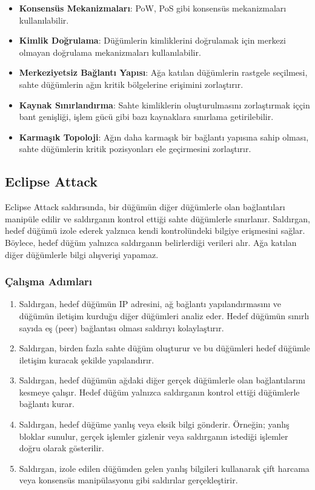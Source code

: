\begin{itemize}
    \item \textbf{Konsensüs Mekanizmaları}: PoW, PoS gibi konsensüs mekanizmaları kullanılabilir.
    \item \textbf{Kimlik Doğrulama}: Düğümlerin kimliklerini doğrulamak için merkezi olmayan doğrulama mekanizmaları kullanılabilir.
    \item \textbf{Merkeziyetsiz Bağlantı Yapısı}: Ağa katılan düğümlerin rastgele seçilmesi, sahte düğümlerin ağın kritik bölgelerine erişimini zorlaştırır.
    \item \textbf{Kaynak Sınırlandırma}: Sahte kimliklerin oluşturulmasını zorlaştırmak iççin bant genişliği, işlem gücü gibi bazı kaynaklara sınırlama getirilebilir.
    \item \textbf{Karmaşık Topoloji}: Ağın daha karmaşık bir bağlantı yapısına sahip olması, sahte düğümlerin kritik pozisyonları ele geçirmesini zorlaştırır.
\end{itemize}

\newpage

\subsection{Eclipse Attack}

Eclipse Attack saldırısında, bir düğümün diğer düğümlerle olan bağlantıları manipüle edilir ve saldırganın kontrol ettiği sahte düğümlerle sınırlanır. Saldırgan, hedef düğümü izole ederek yalznıca kendi kontrolündeki bilgiye erişmesini sağlar. Böylece, hedef düğüm yalnızca saldırganın belirlerdiği verileri alır. Ağa katılan diğer düğümlerle bilgi alışverişi yapamaz.

\subsubsection{Çalışma Adımları}

\begin{enumerate}
    \item Saldırgan, hedef düğümün IP adresini, ağ bağlantı yapılandırmasını ve düğümün iletişim kurduğu diğer düğümleri analiz eder. Hedef düğümün sınırlı sayıda eş (peer) bağlantısı olması saldırıyı kolaylaştırır.
    \item Saldırgan, birden fazla sahte düğüm oluşturur ve bu düğümleri hedef düğümle iletişim kuracak şekilde yapılandırır.
    \item Saldırgan, hedef düğümün ağdaki diğer gerçek düğümlerle olan bağlantılarını kesmeye çalışır. Hedef düğüm yalnızca saldırganın kontrol ettiği düğümlerle bağlantı kurar.
    \item Saldırgan, hedef düğüme yanlış veya eksik bilgi gönderir. Örneğin; yanlış bloklar sunulur, gerçek işlemler gizlenir veya saldırganın istediği işlemler doğru olarak gösterilir.
    \item Saldırgan, izole edilen düğümden gelen yanlış bilgileri kullanarak çift harcama veya konsensüs manipülasyonu gibi saldırılar gerçekleştirir.
\end{enumerate}

